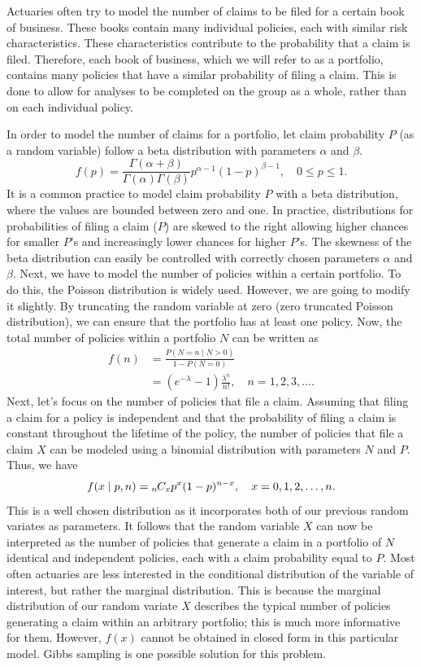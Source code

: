 \documentclass[11pt, oneside]{article}
\begin{document}
Actuaries often try to model the number of claims to be filed for a certain book of business. These books contain many individual policies, each with similar risk characteristics. These characteristics contribute to the probability that a claim is filed. Therefore, each book of business, which we will refer to as a portfolio, contains many policies that have a similar probability of filing a claim. This is done to allow for analyses to be completed on the group as a whole, rather than on each individual policy. 

In order to model the number of claims for a portfolio, let claim probability $P$ (as a random variable) follow a beta distribution with parameters $\alpha$ and $\beta$.
\[
f(p) = \frac{\Gamma(\alpha+\beta)}{\Gamma(\alpha)\Gamma(\beta)}p^{\alpha-1}(1-p)^{\beta-1},\quad 0\le p\le1.
\]
It is a common practice to model claim probability $P$ with a beta distribution, where the values are bounded between zero and one. In practice, distributions for probabilities of filing a claim ($P$) are skewed to the right allowing higher chances for smaller $P$'s and increasingly lower chances for higher $P$'s. The skewness of the beta distribution can easily be controlled with correctly chosen parameters $\alpha$ and $\beta$. Next, we have to model the number of policies within a certain portfolio. To do this, the Poisson distribution is widely used. However, we are going to modify it slightly. By truncating the random variable at zero (zero truncated Poisson distribution), we can ensure that the portfolio has at least one policy. Now, the total number of policies within a portfolio $N$ can be written as
\begin{align*}
f(n) &= \frac{P(N=n\mid N>0)}{1-P(N=0)}\nonumber\\
&= (e^{-\lambda}-1)\frac{\lambda^n}{n!},\quad\mbox{$n=1,2,3,\ldots$}.
\end{align*}
Next, let's focus on the number of policies that file a claim. Assuming that filing a claim for a policy is independent and that the probability of filing a claim is constant throughout the lifetime of the policy, the number of policies that file a claim $X$ can be modeled using a binomial distribution with parameters $N$ and $P$. Thus, we have
\begin{equation}\label{eq:3}
f(x\mid p,n) = {{}_{n}\mkern-1muC_{x}}p^x(1-p)^{n-x},\quad\mbox{$x=0,1,2,\ldots,n$}.
\end{equation}
This is a well chosen distribution as it incorporates both of our previous random variates as parameters. It follows that the random variable $X$ can now be interpreted as the number of policies that generate a claim in a portfolio of $N$ identical and independent policies, each with a claim probability equal to $P$. Most often actuaries are less interested in the conditional distribution of the variable of interest, but rather the marginal distribution. This is because the marginal distribution of our random variate $X$ describes the typical number of policies generating a claim within an arbitrary portfolio; this is much more informative for them. However, $f(x)$ cannot be obtained in closed form in this particular model. Gibbs sampling is one possible solution for this problem.
\end{document}
